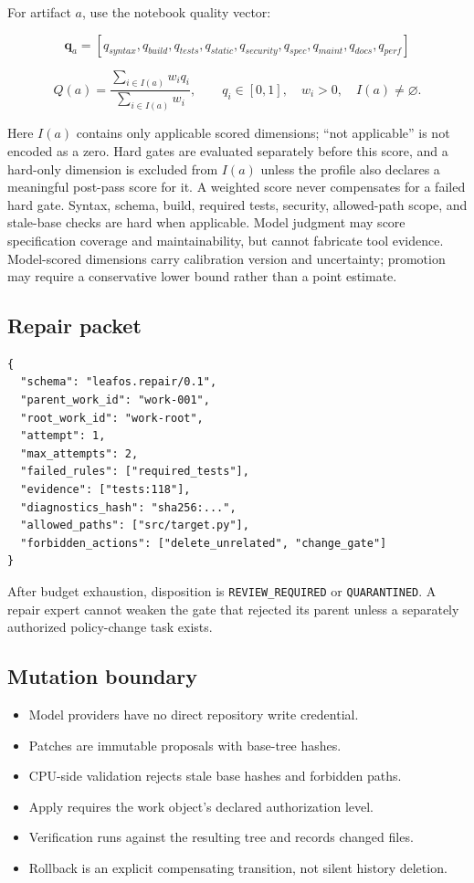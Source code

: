 \documentclass[11pt,letterpaper]{article}
\newcommand{\code}[1]{\texttt{#1}}
\begin{document}
For artifact \(a\), use the notebook quality vector:

\[
\mathbf{q}_a =
[q_{syntax}, q_{build}, q_{tests}, q_{static}, q_{security},
q_{spec}, q_{maint}, q_{docs}, q_{perf}]
\]

\[
Q(a)=
\frac{\sum_{i\in I(a)} w_i q_i}
     {\sum_{i\in I(a)} w_i},
\qquad
q_i\in[0,1],\quad w_i>0,\quad I(a)\neq\varnothing .
\]

Here \(I(a)\) contains only applicable scored dimensions; ``not applicable'' is
not encoded as a zero. Hard gates are evaluated separately before this score,
and a hard-only dimension is excluded from \(I(a)\) unless the profile also
declares a meaningful post-pass score for it.
A weighted score never compensates for a failed hard gate. Syntax, schema,
build, required tests, security, allowed-path scope, and stale-base checks are
hard when applicable. Model judgment may score specification coverage and
maintainability, but cannot fabricate tool evidence. Model-scored dimensions
carry calibration version and uncertainty; promotion may require a conservative
lower bound rather than a point estimate.

\subsection{Repair packet}

\begin{lstlisting}
{
  "schema": "leafos.repair/0.1",
  "parent_work_id": "work-001",
  "root_work_id": "work-root",
  "attempt": 1,
  "max_attempts": 2,
  "failed_rules": ["required_tests"],
  "evidence": ["tests:118"],
  "diagnostics_hash": "sha256:...",
  "allowed_paths": ["src/target.py"],
  "forbidden_actions": ["delete_unrelated", "change_gate"]
}
\end{lstlisting}

After budget exhaustion, disposition is \code{REVIEW\_REQUIRED} or
\code{QUARANTINED}. A repair expert cannot weaken the gate that rejected its
parent unless a separately authorized policy-change task exists.

\subsection{Mutation boundary}

\begin{itemize}
  \item Model providers have no direct repository write credential.
  \item Patches are immutable proposals with base-tree hashes.
  \item CPU-side validation rejects stale base hashes and forbidden paths.
  \item Apply requires the work object's declared authorization level.
  \item Verification runs against the resulting tree and records changed files.
  \item Rollback is an explicit compensating transition, not silent history
        deletion.
\end{itemize}
\end{document}
